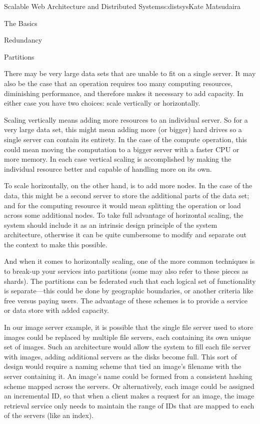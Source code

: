 \begin{aosachapter}{Scalable Web Architecture and Distributed Systems}{s:distsys}{Kate Matsudaira}
\begin{aosasect1}{The Basics}
\begin{aosasect2}{Redundancy}

\end{aosasect2}

\begin{aosasect2}{Partitions}

There may be very large data sets that are unable to fit on a single
server. It may also be the case that an operation requires too many
computing resources, diminishing performance, and therefore makes it
necessary to add capacity. In either case you have two choices: scale
vertically or horizontally.

Scaling vertically means adding more resources to an individual
server. So for a very large data set, this might mean adding more (or
bigger) hard drives so a single server can contain its entirety. In
the case of the compute operation, this could mean moving the
computation to a bigger server with a faster CPU or more memory. In
each case vertical scaling is accomplished by making the individual
resource better and capable of handling more on its own.

To scale horizontally, on the other hand, is to add more nodes. In the
case of the data, this might be a second server to store the
additional parts of the data set; and for the computing resource it
would mean splitting the operation or load across some additional
nodes. To take full advantage of horizontal scaling, the system should
include it as an intrinsic design principle of the system
architecture, otherwise it can be quite cumbersome to modify and
separate out the context to make this possible.

And when it comes to horizontally scaling, one of the more common
techniques is to break-up your services into partitions (some may also
refer to these pieces as shards). The partitions can be federated such
that each logical set of functionality is separate---this could be
done by geographic boundaries, or another criteria like free versus
paying users. The advantage of these schemes is to provide a service
or data store with added capacity.

In our image server example, it is possible that the single file
server used to store images could be replaced by multiple file
servers, each containing its own unique set of images. Such an
architecture would allow the system to fill each file server with
images, adding additional servers as the disks become full. This sort
of design would require a naming scheme that tied an image's filename
with the server containing it. An image's name could be formed from a
consistent hashing scheme mapped across the servers. Or alternatively,
each image could be assigned an incremental ID, so that when a client
makes a request for an image, the image retrieval service only needs
to maintain the range of IDs that are mapped to each of the servers
(like an index).


\end{aosasect2}
\end{aosasect1}
\end{aosachapter}

